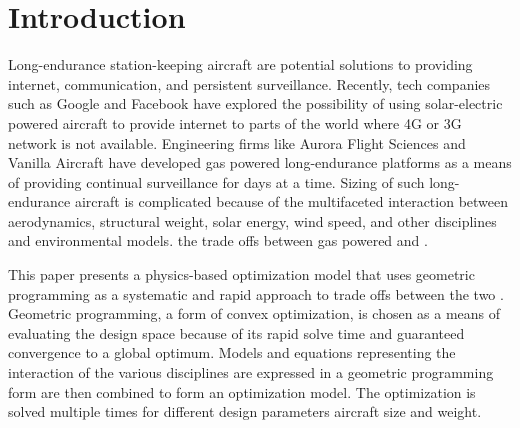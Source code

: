 \section{Introduction}

Long-endurance station-keeping aircraft are potential solutions to providing internet, communication, and persistent surveillance. 
Recently, tech companies such as Google\cite{googletitan} and Facebook\cite{aquila} have explored the possibility of using solar-electric powered aircraft to provide internet to parts of the world where 4G or 3G network is not available. 
Engineering firms like Aurora Flight Sciences\cite{orion} and Vanilla Aircraft\cite{vanilla} have developed gas powered long-endurance platforms as a means of providing continual surveillance for days at a time.  
Sizing of such long-endurance aircraft is complicated because of the multifaceted interaction between aerodynamics, structural weight, solar energy, wind speed, and other disciplines and environmental models.
\DIFdelbegin {}\DIFdelend \DIFaddbegin {}\DIFaddend the trade offs between gas powered and \DIFdelbegin {}\DIFdelend \DIFaddbegin {}\DIFaddend . 

This paper presents a physics-based optimization model that uses geometric programming as a systematic and rapid approach to \DIFdelbegin {}\DIFdelend \DIFaddbegin {}\DIFaddend trade offs between the two \DIFdelbegin {}\DIFdelend \DIFaddbegin {}\DIFaddend .  Geometric programming, a form of convex optimization, is chosen as a means of evaluating the design space because of its rapid solve time and guaranteed convergence to a global optimum.\cite{gp}
Models and equations representing the interaction of the various disciplines are expressed in a geometric programming form \DIFdelbegin {}\DIFdelend \DIFaddbegin {}\DIFaddend are then combined to form an optimization model. 
The optimization is solved multiple times for different design parameters \DIFdelbegin {}\DIFdelend \DIFaddbegin {}\DIFaddend aircraft size and weight\DIFdelbegin {}\DIFdelend . 

